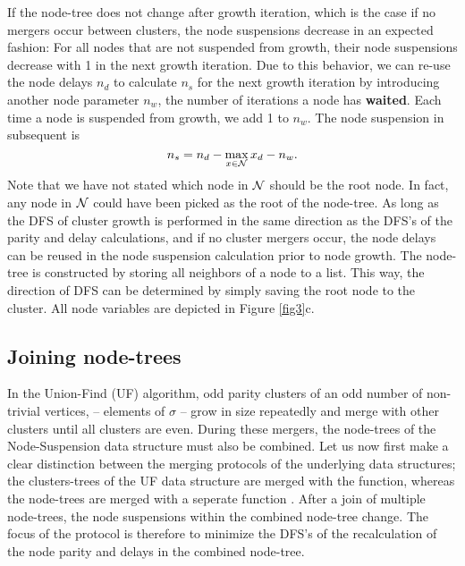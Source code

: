 If the node-tree does not change after growth iteration, which is the case if no mergers occur between clusters, the node suspensions decrease in an expected fashion: For all nodes that are not suspended from growth, their node suspensions decrease with 1 in the next growth iteration. Due to this behavior, we can re-use the node delays $n_d$ to calculate $n_s$ for the next growth iteration by introducing another node parameter $n_w$, the number of iterations a node has \textbf{waited}. Each time a node is suspended from growth, we add 1 to $n_w$. The node suspension in subsequent is
\begin{equation}\label{eq:suspension}
    n_s = n_d - \max_{x \in \nset}{x_d} - n_w. 
\end{equation}
Note that we have not stated which node in $\mathcal{N}$ should be the root node. In fact, any node in $\mathcal{N}$ could have been picked as the root of the node-tree. As long as the DFS of cluster growth is performed in the same direction as the DFS's of the parity and delay calculations, and if no cluster mergers occur, the node delays can be reused in the node suspension calculation prior to node growth. 
The node-tree is constructed by storing all neighbors of a node to a list. This way, the direction of DFS can be determined by simply saving the root node to the cluster. All node variables are depicted in Figure \ref{fig3}c. 


\subsection{Joining node-trees}\label{sec:nodejoin}

In the Union-Find (UF) algorithm, odd parity clusters of an odd number of non-trivial vertices, -- elements of $\sigma$ -- grow in size repeatedly and merge with other clusters until all clusters are even. During these mergers, the node-trees of the Node-Suspension data structure must also be combined. Let us now first make a clear distinction between the merging protocols of the underlying data structures; the clusters-trees of the UF data structure are merged with the  function, whereas the node-trees are merged with a seperate function . After a join of multiple node-trees, the node suspensions within the combined node-tree change. The focus of the  protocol is therefore to minimize the DFS's of the recalculation of the node parity and delays in the combined node-tree. 

